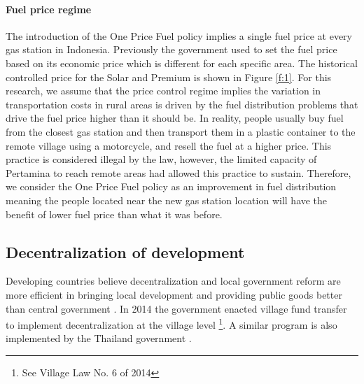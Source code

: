 \documentclass[letterpaper,12pt,leqno]{article}
\begin{document}
\paragraph{Fuel price regime} The introduction of the One Price Fuel policy implies a single fuel price at every gas station in Indonesia. Previously the government used to set the fuel price based on its economic price which is different for each specific area. The historical controlled price for the Solar and Premium is shown in Figure \ref{f:1}. For this research, we assume that the price control regime implies the variation in transportation costs in rural areas is driven by the fuel distribution problems that drive the fuel price higher than it should be. In reality, people usually buy fuel from the closest gas station and then transport them in a plastic container to the remote village using a motorcycle, and resell the fuel at a higher price. This practice is considered illegal by the law, however, the limited capacity of Pertamina to reach remote areas had allowed this practice to sustain. Therefore, we consider the One Price Fuel policy as an improvement in fuel distribution meaning the people located near the new gas station location will have the benefit of lower fuel price than what it was before.

\subsection{Decentralization of development}\label{ss:decentral}

Developing countries believe decentralization and local government reform are more efficient in bringing local development \citep{vazquez_2017} and providing public goods better than central government \citep{arends2020}. In 2014 the government enacted village fund transfer to implement decentralization at the village level \footnote{See Village Law No. 6 of 2014}. A similar program is also implemented by the Thailand government \citep{Boonperm2013}.
\end{document}

